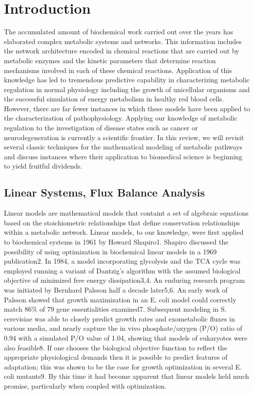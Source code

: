 \documentclass[phd,tocprelim]{cornell}
\theoremstyle{break}
\begin{document}
\contentspage
\tablelistpage
\figurelistpage

\normalspacing \setcounter{page}{1} 
\pagestyle{cornell} \addtolength{\parskip}{0.5\baselineskip}

\chapter{Introduction}

The accumulated amount of biochemical work carried out over the years
has elaborated complex metabolic systems and networks.  This
information includes the network architecture encoded in chemical
reactions that are carried out by metabolic enzymes and the kinetic
parameters that determine reaction mechanisms involved in each of
these chemical reactions.  Application of this knowledge has led to
tremendous predictive capability in characterizing metabolic
regulation in normal physiology including the growth of unicellular
organisms and the successful simulation of energy metabolism in
healthy red blood cells.  However, there are far fewer instances in
which these models have been applied to the characterization of
pathophysiology.  Applying our knowledge of metabolic regulation to
the investigation of disease states such as cancer or
neurodegeneration is currently a scientific frontier.  In this review,
we will revisit several classic techniques for the mathematical
modeling of metabolic pathways and discuss instances where their
application to biomedical science is beginning to yield fruitful
dividends.

\section{Linear Systems, Flux Balance Analysis}
Linear models are mathematical models that containt a set of algebraic
equations based on the stoichiometric relationships that define
conservation relationships within a metabolic network.  Linear models,
to our knowledge, were first applied to biochemical systems in 1961 by
Howard Shapiro1. Shapiro discussed the possibility of using
optimization in biochemical linear models in a 1969 publication2. In
1984, a model incorporating glycolysis and the TCA cycle was employed
running a variant of Dantzig’s algorithm with the assumed biological
objective of minimized free energy dissipation3,4. An enduring
research program was initiated by Bernhard Palsson half a decade
later5,6.  An early work of Palsson showed that growth maximization in
an E. coli model could correctly match 86\% of 79 gene essentialities
examined7. Subsequent modeling in S. cerevisiae was able to closely
predict growth rates and exometabolic fluxes in various media, and
nearly capture the in vivo phosphate/oxygen (P/O) ratio of 0.94 with a
simulated P/O value of 1.04, showing that models of eukaryotes were
also feasible8. If one chooses the biological objective function to
reflect the appropriate physiological demands then it is possible to
predict features of adaptation; this was shown to be the case for
growth optimization in several E. coli mutants9. By this time it had
become apparent that linear models held much promise, particularly
when coupled with optimization.
\end{document}
